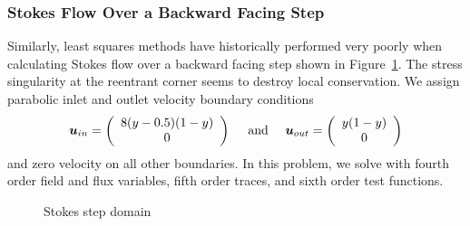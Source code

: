\documentclass[Proposal.tex]{subfiles}
\begin{document}
\subsubsection{Stokes Flow Over a Backward Facing Step}\label{sec:stokesStep}
Similarly, least squares methods have historically performed very poorly when
calculating Stokes flow over a backward facing step shown in
Figure~\ref{fig:stokesStepDomain}. The stress singularity at
the reentrant corner seems to destroy local conservation. We
assign parabolic inlet and outlet velocity boundary conditions
\[
\boldsymbol u_{in}=\left( \begin{array}{c} 8(y-0.5)(1-y)\\ 0\\ \end{array} \right)
\quad\text{ and }\quad
\boldsymbol u_{out}=\left( \begin{array}{c} y(1-y)\\ 0\\ \end{array} \right)
\]
and zero velocity on all other boundaries. In this problem, we solve with
fourth order field and flux variables, fifth order traces, and sixth order
test functions.

\begin{figure}[p]
\centering
{}
\caption{Stokes step domain}
\label{fig:stokesStepDomain}
\end{figure}
\end{document}
